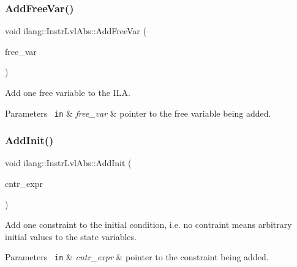 \subsubsection{\texorpdfstring{Add\+Free\+Var()}{AddFreeVar()}}
{\footnotesize\ttfamily void ilang\+::\+Instr\+Lvl\+Abs\+::\+Add\+Free\+Var (\begin{DoxyParamCaption}\item[{const \mbox{\hyperlink{namespaceilang_a7c4196c72e53ea4df4b7861af7bc3bce}{Expr\+Ptr}}}]{free\+\_\+var }\end{DoxyParamCaption})}



Add one free variable to the I\+LA. 


\begin{DoxyParams}[1]{Parameters}
\mbox{\texttt{ in}}  & {\em free\+\_\+var} & pointer to the free variable being added. \\
\hline
\end{DoxyParams}
\mbox{\label{classilang_1_1_instr_lvl_abs_acf80b0773ba82149af7c8a170219a4da}} 
\subsubsection{\texorpdfstring{Add\+Init()}{AddInit()}}
{\footnotesize\ttfamily void ilang\+::\+Instr\+Lvl\+Abs\+::\+Add\+Init (\begin{DoxyParamCaption}\item[{const \mbox{\hyperlink{namespaceilang_a7c4196c72e53ea4df4b7861af7bc3bce}{Expr\+Ptr}}}]{cntr\+\_\+expr }\end{DoxyParamCaption})}



Add one constraint to the initial condition, i.\+e. no contraint means arbitrary initial values to the state variables. 


\begin{DoxyParams}[1]{Parameters}
\mbox{\texttt{ in}}  & {\em cntr\+\_\+expr} & pointer to the constraint being added. \\
\hline
\end{DoxyParams}
\mbox{\label{classilang_1_1_instr_lvl_abs_a7ee8ecc23167ed9dece4001c72ffcdff}} 
